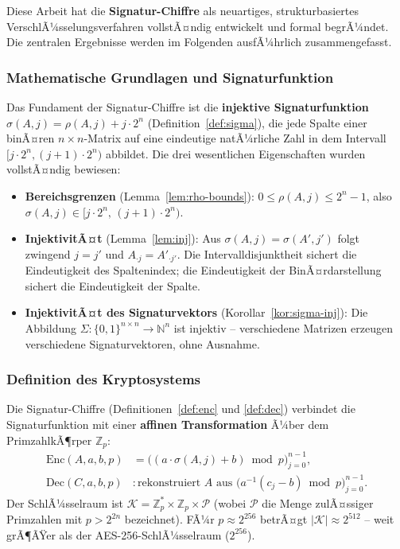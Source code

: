 ﻿\documentclass[a4paper,12pt]{scrreprt}
\theoremstyle{definition}
\begin{document}
Diese Arbeit hat die \textbf{Signatur-Chiffre} als neuartiges, strukturbasiertes VerschlÃ¼sselungsverfahren vollstÃ¤ndig entwickelt und formal begrÃ¼ndet. Die zentralen Ergebnisse werden im Folgenden ausfÃ¼hrlich zusammengefasst.

\subsubsection{Mathematische Grundlagen und Signaturfunktion}

Das Fundament der Signatur-Chiffre ist die \textbf{injektive Signaturfunktion} $\sigma(A,j) = \rho(A,j) + j \cdot 2^n$ (Definition~\ref{def:sigma}), die jede Spalte einer binÃ¤ren $n \times n$-Matrix auf eine eindeutige natÃ¼rliche Zahl in dem Intervall $[j \cdot 2^n, (j+1) \cdot 2^n)$ abbildet. Die drei wesentlichen Eigenschaften wurden vollstÃ¤ndig bewiesen:

\begin{itemize}
  \item \textbf{Bereichsgrenzen} (Lemma~\ref{lem:rho-bounds}): $0 \leq \rho(A,j) \leq 2^n - 1$, also $\sigma(A,j) \in [j \cdot 2^n,\, (j+1) \cdot 2^n)$.
  \item \textbf{InjektivitÃ¤t} (Lemma~\ref{lem:inj}): Aus $\sigma(A,j) = \sigma(A',j')$ folgt zwingend $j = j'$ und $A_{\cdot j} = A'_{\cdot j'}$. Die Intervalldisjunktheit sichert die Eindeutigkeit des Spaltenindex; die Eindeutigkeit der BinÃ¤rdarstellung sichert die Eindeutigkeit der Spalte.
  \item \textbf{InjektivitÃ¤t des Signaturvektors} (Korollar~\ref{kor:sigma-inj}): Die Abbildung $\Sigma: \{0,1\}^{n \times n} \to \mathbb{N}^n$ ist injektiv -- verschiedene Matrizen erzeugen verschiedene Signaturvektoren, ohne Ausnahme.
\end{itemize}

\subsubsection{Definition des Kryptosystems}

Die Signatur-Chiffre (Definitionen~\ref{def:enc} und \ref{def:dec}) verbindet die Signaturfunktion mit einer \textbf{affinen Transformation} Ã¼ber dem PrimzahlkÃ¶rper $\mathbb{Z}_p$:
\begin{align*}
\mathrm{Enc}(A, a, b, p) &= \bigl((a \cdot \sigma(A,j) + b) \bmod p\bigr)_{j=0}^{n-1}, \\
\mathrm{Dec}(C, a, b, p) &: \text{rekonstruiert } A \text{ aus } \bigl(a^{-1}(c_j - b) \bmod p\bigr)_{j=0}^{n-1}.
\end{align*}
Der SchlÃ¼sselraum ist $\mathcal{K} = \mathbb{Z}_p^* \times \mathbb{Z}_p \times \mathcal{P}$ (wobei $\mathcal{P}$ die Menge zulÃ¤ssiger Primzahlen mit $p > 2^{2n}$ bezeichnet). FÃ¼r $p \approx 2^{256}$ betrÃ¤gt $|\mathcal{K}| \approx 2^{512}$ -- weit grÃ¶ÃŸer als der AES-256-SchlÃ¼sselraum ($2^{256}$).
\end{document}
